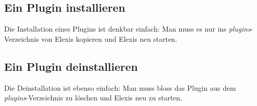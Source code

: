 \subsection{Ein Plugin installieren}
Die Installation eines Plugins ist denkbar einfach: Man muss es nur ins \textit{plugins}-Verzeichnis von Elexis kopieren und Elexis neu starten.

\subsection{Ein Plugin deinstallieren}
Die Deinstallation ist ebenso einfach: Man muss bloss das Plugin aus dem \textit{plugins}-Verzeichnis zu löschen und Elexis neu zu starten.

